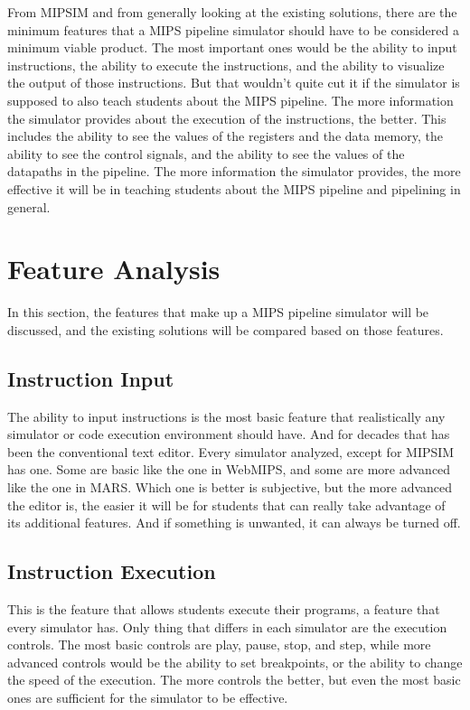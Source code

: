 From MIPSIM and from generally looking at the existing solutions, there are the minimum features that a MIPS pipeline simulator should have to be considered a minimum viable product. The most important ones would be the ability to input instructions, the ability to execute the instructions, and the ability to visualize the output of those instructions. But that wouldn't quite cut it if the simulator is supposed to also teach students about the MIPS pipeline. The more information the simulator provides about the execution of the instructions, the better. This includes the ability to see the values of the registers and the data memory, the ability to see the control signals, and the ability to see the values of the datapaths in the pipeline. The more information the simulator provides, the more effective it will be in teaching students about the MIPS pipeline and pipelining in general.


\section{Feature Analysis}\label{sec:feature_comparison}

In this section, the features that make up a MIPS pipeline simulator will be discussed, and the existing solutions will be compared based on those features.

\subsection{Instruction Input}\label{sec:instruction_input}
The ability to input instructions is the most basic feature that realistically any simulator or code execution environment should have. And for decades that has been the conventional text editor. Every simulator analyzed, except for MIPSIM has one. Some are basic like the one in WebMIPS, and some are more advanced like the one in MARS. Which one is better is subjective, but the more advanced the editor is, the easier it will be for students that can really take advantage of its additional features. And if something is unwanted, it can always be turned off.

\subsection{Instruction Execution}\label{sec:instruction_execution}
This is the feature that allows students execute their programs, a feature that every simulator has. Only thing that differs in each simulator are the execution controls. The most basic controls are play, pause, stop, and step, while more advanced controls would be the ability to set breakpoints, or the ability to change the speed of the execution. The more controls the better, but even the most basic ones are sufficient for the simulator to be effective.

